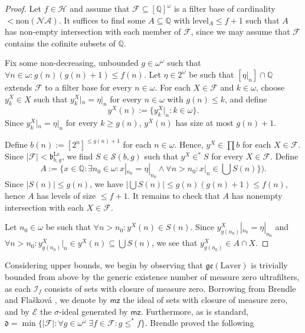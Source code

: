 \documentclass[12pt]{article}
\theoremstyle{definition}
\newcommand\level{\text{level}}
\begin{document}
\begin{proof}
Let $f\in \mathcal{H}$ and assume that $\mathcal{F} \subseteq [\mathbb{Q}]^\omega$ is a filter base of cardinality $<\text{non}(\mathcal{NA})$. It suffices to find some $A \subseteq \mathbb{Q}$ with $\level_A\leq f+1$ such that $A$ has non-empty intersection with each member of $\mathcal{F}$, since we may assume that $\mathcal{F}$ contains the cofinite subsets of $\mathbb{Q}$.

Fix some non-decreasing, unbounded $g \in \omega^\omega$ such that $\forall n \in \omega: g(n)(g(n)+1) \leq f(n)$. Let $\eta \in 2^{\omega}$ be such that $[\eta|_n]\cap \mathbb{Q}$ extends $\mathcal{F}$ to a filter base for every $n\in \omega$. For each $X \in \mathcal{F}$ and $k \in \omega$, choose $y_k^{X} \in X$ such that $y_k^{X}|_n=\eta|_n$ for every $n \in \omega$ with $g(n)\leq k$, and define
\[y^{X}(n):=\{y^{X}_k|_n: k \in \omega\}.\]
Since $y^{X}_k|_n=\eta|_n$ for every $k \geq g(n)$, $y^{X}(n)$ has size at most $g(n)+1$.

Define $b(n):=[2^n]^{\leq g(n)+1}$ for each $n \in \omega$. Hence, $y^{X}\in \prod b$ for each $X \in \mathcal{F}$. Since $|\mathcal{F}|<\mathfrak{b}^{\text{Lc}}_{b,g}$, we find $S \in \mathcal{S}(b, g)$ such that $y^{X}\in^{\ast}S$ for every $X \in \mathcal{F}$. Define
\[A:=\{x \in \mathbb{Q}: \exists n_0 \in \omega : x|_{n_0}=\eta|_{n_0} \land \forall n >n_0: x|_n \in \bigcup S(n)\}).\]
Since $|S(n)|\leq g(n)$, we have $|\bigcup S(n)|\leq g(n)(g(n)+1)\leq f(n)$, hence $A$ has levels of size $\leq f+1$. It remains to check that $A$ has nonempty intersection with each $X \in \mathcal{F}$.

Let $n_0 \in \omega$ be such that $\forall n > n_0: y^{X}(n)\in S(n)$. Since $y^{X}_{g(n_0)}|_{n_0}=\eta|_{n_0}$ and $\forall n > n_0: y^{X}_{g(n_0)}|_n \in y^{X}(n) \subseteq \bigcup S(n)$, we see that $y^{X}_{g(n_0)} \in A \cap X$.
\end{proof}

\pagebreak

Considering upper bounds, we begin by observing that $\mathfrak{ge}(\text{Laver})$ is trivially bounded from above by the generic existence number of measure zero ultrafilters, as each $\mathcal{I}_f$ consists of sets with closure of measure zero. Borrowing from Brendle and Fla\v{s}kov\'a \cite{brefla17}, we denote by $\textsf{mz}$ the ideal of sets with closure of measure zero, and by $\mathcal{E}$ the $\sigma$-ideal generated by $\textsf{mz}$. Furthermore, as is standard, $\mathfrak{d}=\min\{|\mathcal{F}|: \forall g \in \omega^\omega \:\exists f \in \mathcal{F}: g \leq^{\ast}f\}$. Brendle \cite{brendle-between} proved the following
\end{document}
